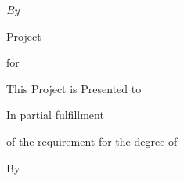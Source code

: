 \begin{titlepage}
\centering
\vspace*{0.4cm}
{\fontsize{26}{36}\selectfont \projecttitle\par}
\vspace{0.8cm}
\unilogo{4.2cm}\par
\vspace{2.6cm}
{\large\textit{By}\par}
\vspace{0.2cm}
{\Large \studentA\par \studentB\par}
\vspace{0.8cm}
{\Large Project\par}
\vspace{0.6cm}
{\Large for\par}
\vspace{0.6cm}
{\Large \degreelong\par}
\vspace{1cm}
{\LARGE \university\par}
\vspace{0.3cm}
{\LARGE \city\par}
\vspace{0.8cm}
{\Large \session\par}
\end{titlepage}

\setcounter{page}{2}
\begin{center}
\begin{minipage}{0.24\linewidth}\unilogo{3.6cm}\end{minipage}%
\begin{minipage}{0.74\linewidth}\raggedleft{\Large\bfseries \university}\end{minipage}\par
\vspace{1.2cm}
{\fontsize{22}{30}\selectfont \projecttitle\par}
\vspace{1.4cm}
{\large This Project is Presented to\par}
\vspace{1.2cm}
{\Large \university\par}
\vspace{1.2cm}
{\large In partial fulfillment\par}
\vspace{0.3cm}
{\large of the requirement for the degree of\par}
\vspace{1.2cm}
{\fontsize{22}{30}\selectfont \degree\par}
\vspace{1.2cm}
{By\par}
\vspace{0.6cm}
{\large \studentA\par \studentB\par}
\vspace{1cm}
{\Large \session\par}
\end{center}
\clearpage

